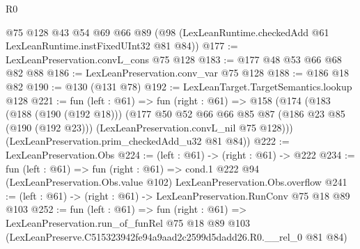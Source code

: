 \begin{lexlean}{R0}
\begin{coremodule}
    @75
    @128
    @43
    @54
    @69
    @66
    @89
    (@98 (LexLeanRuntime.checkedAdd @61 LexLeanRuntime.instFixedUInt32 @81 @84))
@177 := LexLeanPreservation.convL_cons @75 @128
@183 := @177 @48 @53 @66 @68 @82 @88
@186 := LexLeanPreservation.conv_var @75 @128
@188 := @186 @18 @82
@190 := @130 (@131 @78)
@192 := LexLeanTarget.TargetSemantics.lookup @128
@221 := fun (left : @61) =>
  fun (right : @61) =>
  @158
    (@174
      (@183
        (@188 (@190 (@192 @18)))
        (@177
          @50
          @52
          @66
          @66
          @85
          @87
          (@186 @23 @85 (@190 (@192 @23)))
          (LexLeanPreservation.convL_nil @75 @128)))
      (LexLeanPreservation.prim_checkedAdd_u32 @81 @84))
@222 := LexLeanPreservation.Obs
@224 := (left : @61) -> (right : @61) -> @222
@234 := fun (left : @61) =>
  fun (right : @61) =>
  cond.{1} @222 @94 (LexLeanPreservation.Obs.value @102) LexLeanPreservation.Obs.overflow
@241 := (left : @61) -> (right : @61) -> LexLeanPreservation.RunConv @75 @18 @89 @103
@252 := fun (left : @61) =>
  fun (right : @61) =>
  LexLeanPreservation.run_of_funRel
    @75
    @18
    @89
    @103
    (LexLeanPreserve.C515323942fe94a9aad2c2599d5dadd26.R0.__rel_0 @81 @84)
\end{coremodule}
\end{lexlean}
